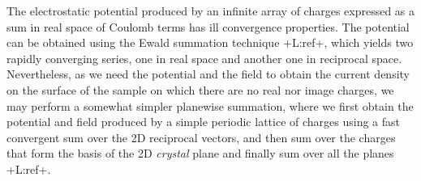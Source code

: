 \documentclass{article}
\newcommand{\notaL}[1]{{\color{blue}+L:#1+}}
\begin{document}
The electrostatic potential produced by an infinite array of
charges expressed as a sum in real space of Coulomb terms has ill
convergence properties. The potential can be obtained
using the Ewald summation technique \notaL{ref}, which yields two rapidly converging
series, one in real space and another one in reciprocal space.
Nevertheless, as we need the potential and the field to obtain the
current density on the surface of the sample on which there are no
real nor image charges, we may perform a somewhat simpler planewise
summation, where we first obtain the potential and field produced by a
simple periodic lattice of charges using a fast convergent sum over the 2D
reciprocal vectors, and then sum over the charges that form the basis
of the 2D {\em crystal} plane and finally sum over all the planes \notaL{ref}.
\end{document}
